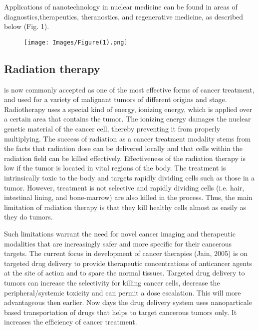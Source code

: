 \documentclass{article}
\begin{document}
Applications of nanotechnology in nuclear medicine can be found in areas of diagnostics,therapeutics, theranostics, and regenerative medicine, as described below (Fig. 1).



\begin{figure}[H]
    \centering
    \texttt{[image: Images/Figure(1).png]}
    \label{fig:1}
\end{figure}


\begin{multicols}



\section{Radiation therapy  }
is now commonly accepted as one of the most effective forms of cancer treatment, and used for a variety of malignant tumors of different origins and stage. Radiotherapy uses a special kind of energy, ionizing energy, which is applied over a certain area that contains the tumor. The ionizing energy damages the nuclear genetic material of the cancer cell, thereby preventing it from properly multiplying. The success of radiation as a cancer treatment modality stems from the facts that radiation dose can be delivered locally and that cells within the radiation field can be killed effectively. Effectiveness of the radiation therapy is low if the tumor is located in vital regions of the body. The treatment is intrinsically toxic to the body and targets rapidly dividing cells such as those in a tumor. However, treatment is not selective and rapidly dividing cells (i.e. hair, intestinal lining, and bone-marrow) are also killed in the process. Thus, the main
limitation of radiation therapy is that they kill healthy cells almost as easily as they do
tumors.


Such limitations warrant the need for novel cancer imaging and therapeutic modalities that are increasingly safer and more specific for their cancerous targets. The current focus in development of cancer therapies (Jain, 2005) is on targeted drug delivery to provide therapeutic concentrations of anticancer agents at the site of action and to spare the normal tissues. Targeted drug delivery to tumors can increase the selectivity for killing cancer cells, decrease the peripheral/systemic toxicity and can permit a dose escalation. This will more advantageous then earlier. Now days the drug delivery system uses nanoparticale based transportation of drugs that helps to target cancerous tumors  only. It increases the efficiency of cancer treatment.


\end{multicols}
\end{document}
